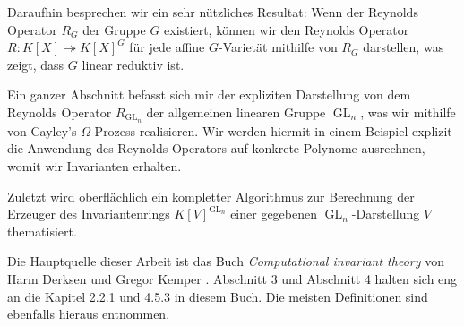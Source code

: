 Daraufhin besprechen wir ein sehr n\"utzliches Resultat:  Wenn der Reynolds Operator $R_G$ der Gruppe $G$ existiert, k\"onnen wir den Reynolds Operator \linebreak$R \colon K[X] \twoheadrightarrow K[X]^G$ f\"ur jede affine $G$-Variet\"at mithilfe von $R_G$ darstellen, was zeigt, dass $G$ linear reduktiv ist.

Ein ganzer Abschnitt befasst sich mir der expliziten Darstellung von dem Reynolds Operator $R_{\operatorname{GL}_n}$ der allgemeinen linearen Gruppe $\operatorname{GL}_n$, was wir mithilfe von Cayley's $\Omega$-Prozess realisieren.
Wir werden hiermit in einem Beispiel explizit die Anwendung des Reynolds Operators auf konkrete Polynome ausrechnen, womit wir Invarianten erhalten.

Zuletzt wird oberfl\"achlich ein kompletter Algorithmus zur Berechnung der Erzeuger des Invariantenrings $K[V]^{\operatorname{GL}_n}$ einer gegebenen $\operatorname{GL}_n$-Darstellung $V$ thematisiert.
\vspace{0.3cm}

Die Hauptquelle dieser Arbeit ist das Buch \textit{Computational invariant theory} von Harm Derksen und Gregor Kemper \cite{DK15}.
Abschnitt 3 und Abschnitt 4 halten sich eng an die Kapitel 2.2.1 und 4.5.3 in diesem Buch.
Die meisten Definitionen sind ebenfalls hieraus entnommen.


